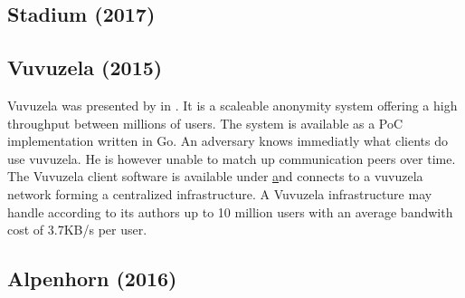 %

\subsection{Stadium (2017)}
\cite{tyagi2017stadium}

%

\subsection{Vuvuzela (2015)}
Vuvuzela was presented by \citeauthor{van2015vuvuzela} in \cite{van2015vuvuzela}. It is a scaleable anonymity system offering a high throughput between millions of users. The system is available as a PoC implementation written in Go. An adversary knows immediatly what clients do use vuvuzela. He is however unable to match up communication peers over time. The Vuvuzela client software is available under \href{https://vuvuzela.io/} and connects to a vuvuzela network forming a centralized infrastructure. A Vuvuzela infrastructure may handle according to its authors up to 10 million users with an average bandwith cost of 3.7KB/s per user.

\subsection{Alpenhorn (2016)}
\cite{lazar2016alpenhorn}
